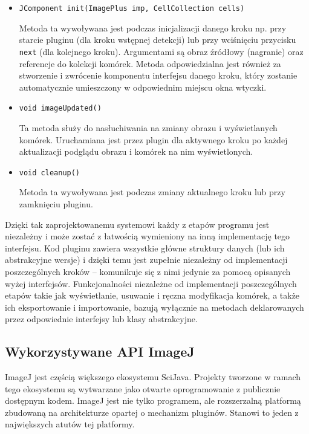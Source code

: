 \documentclass[declaration,shortabstract,mgr]{iithesis}
\begin{document}
\begin{itemize}

\item \texttt{JComponent init(ImagePlus imp, CellCollection cells)}

Metoda ta wywoływana jest podczas inicjalizacji danego kroku np. przy starcie pluginu (dla kroku wstępnej detekcji) lub przy wciśnięciu przycisku \texttt{next} (dla kolejnego kroku).
Argumentami są obraz źródłowy (nagranie) oraz referencje do kolekcji komórek.
Metoda odpowiedzialna jest również za stworzenie i zwrócenie komponentu interfejsu danego kroku, który zostanie automatycznie umieszczony w odpowiednim miejscu okna wtyczki.

\item \texttt{void imageUpdated()}

Ta metoda służy do nasłuchiwania na zmiany obrazu i wyświetlanych komórek.
Uruchamiana jest przez plugin dla aktywnego kroku po każdej aktualizacji podglądu obrazu i komórek na nim wyświetlonych.

\item \texttt{void cleanup()}

Metoda ta wywoływana jest podczas zmiany aktualnego kroku lub przy zamknięciu pluginu.

\end{itemize}

Dzięki tak zaprojektowanemu systemowi każdy z etapów programu jest niezależny i może zostać z łatwością wymieniony na inną implementację tego interfejsu.
Kod pluginu zawiera wszystkie główne struktury danych (lub ich abstrakcyjne wersje) i dzięki temu jest zupełnie niezależny od implementacji poszczególnych kroków -- komunikuje się z nimi jedynie za pomocą opisanych wyżej interfejsów.
Funkcjonalności niezależne od implementacji poszczególnych etapów takie jak wyświetlanie, usuwanie i ręczna modyfikacja komórek, a także ich eksportowanie i importowanie, bazują wyłącznie na metodach deklarowanych przez odpowiednie interfejsy lub klasy abstrakcyjne.

\subsection{Wykorzystywane API ImageJ}

ImageJ jest częścią większego ekosystemu SciJava.
Projekty tworzone w ramach tego ekosystemu są wytwarzane jako otwarte oprogramowanie z publicznie dostępnym kodem.
ImageJ jest nie tylko programem, ale rozszerzalną platformą zbudowaną na architekturze opartej o mechanizm pluginów.
Stanowi to jeden z największych atutów tej platformy\cite{imagej:philosophy}.
\end{document}

